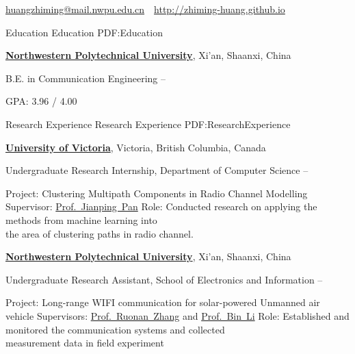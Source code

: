\documentclass[letterpaper,MMMyyyy,nonstopmode]{simpleresumecv}
\newcommand{\CVAuthor}{Zhiming Huang}
\newcommand{\CVWebpage}{http://zhiming-huang.github.io}
\begin{document}

\Title{\CVAuthor}

\begin{SubTitle}
\href{mailto:huangzhiming@mail.nwpu.edu.cn}
{huangzhiming@mail.nwpu.edu.cn}
\,\SubBulletSymbol\,
\href{\CVWebpage}
{\url{\CVWebpage}}
\end{SubTitle}

\begin{Body}


\Section
{Education}
{Education}
{PDF:Education}

\Entry
\href{http://en.nwpu.edu.cn/EnglishNew/AboutNPU/overviewnew.htm}
{\textbf{Northwestern Polytechnical University}},
Xi'an, Shaanxi, China

\Gap
\BulletItem
B.E. in
{Communication Engineering}
\hfill
{} --
\begin{Detail}
\SubBulletItem
GPA: 3.96 / 4.00
\end{Detail}


\Section
{Research Experience}
{Research Experience}
{PDF:ResearchExperience}

\Entry
\href{http://www.uvic.ca/}
{\textbf{University of Victoria}},
Victoria, British Columbia, Canada

\Gap
\BulletItem
Undergraduate Research Internship, Department of Computer Science
\hfill
{} --
\begin{Detail}
\SubBulletItem
Project:
Clustering Multipath Components in Radio Channel Modelling
\SubBulletItem
Supervisor:
\href{http://webhome.cs.uvic.ca/~pan/}
{Prof.~Jianping~Pan}
\SubBulletItem
Role:
Conducted research on applying the methods from machine learning into \\the area of clustering paths in radio channel.
\end{Detail}

\Entry
\href{http://en.nwpu.edu.cn/}
{\textbf{Northwestern Polytechnical University}},
Xi'an, Shaanxi, China

\Gap
\BulletItem
Undergraduate Research Assistant, School of Electronics and Information
\hfill
{} --
\begin{Detail}
\SubBulletItem
Project:
Long-range WIFI communication for solar-powered Unmanned air vehicle
\SubBulletItem
Supervisors:
\href{http://teacher.nwpu.edu.cn/rzhang}
{Prof.~Ruonan~Zhang} and
\href{http://teacher.nwpu.edu.cn/2014010059.html}
{Prof.~Bin~Li}
\SubBulletItem
Role: Established and monitored the communication systems and collected \\ measurement data in field experiment


\end{Detail}
\end{Body}
\end{document}
